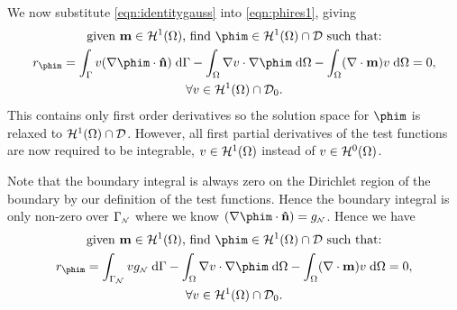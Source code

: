 We now substitute \eqref{eqn:identitygauss} into \eqref{eqn:phires1}, giving
\begin{gather}
  \text{given $\mv \in \sob^1(\magd)$, find $\phim \in \sob^1(\magd) \cap \Dfs$ such that:} \notag \\
  r_{\phim} = \int_{\boundd} v (\nabla \phim \cdot \nv) \d \boundd
  - \int_\magd \nabla v \cdot \nabla \phim \d \magd
  - \int_\magd (\nabla \cdot \mv) v \d \magd = 0
  , \notag \\
  \forall v \in \sob^1(\magd) \cap \Dfs_0. \notag
\end{gather}
This contains only first order derivatives so the solution space for $\phim$ is relaxed to $\mathcal{H}^1(\Omega) \cap \mathcal{D}$. However, all first partial derivatives of the test functions are now required to be integrable, \ie $v \in \mathcal{H}^1(\Omega)$ instead of $v \in \mathcal{H}^0(\Omega)$.

Note that the boundary integral is always zero on the Dirichlet region of the boundary by our definition of the test functions. Hence the boundary integral is only non-zero over ${\Gamma}_{{\scriptscriptstyle{\mathcal{N}}}}$ where we know $(\nabla \phim \cdot \nv) = g_{\Neu}$. Hence we have
\begin{gather}
  \text{given $\mv \in \sob^1(\magd)$, find $\phim \in \sob^1(\magd) \cap \Dfs$ such that:} \notag \\
  r_{\phim} = \int_{\boundd_\Neu} v g_\Neu \d \boundd
  - \int_\magd \nabla v \cdot \nabla \phim \d \magd
  - \int_\magd (\nabla \cdot \mv) v \d \magd = 0
  , \label{res:contphi} \\
  \forall v \in \sob^1(\magd) \cap \Dfs_0. \notag
\end{gather}



